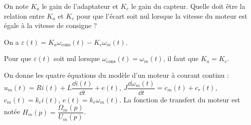 \begin{figure}[!h]
\begin{center}
\end{center}

\end{figure}
\normalsize
\fi

\begin{question}
On note $K_a$ le gain de l'adaptateur et $K_c$ le gain du capteur. Quelle doit être la relation entre 
$K_a$ et $K_c$ pour que l'écart soit nul lorsque la vitesse du moteur est égale à la vitesse de consigne ?
\end{question}
\ifprof
\begin{corrige}
On a $\varepsilon(t) = K_a \omega_{\text{cons}}(t) - K_c \omega_m(t)$. 

Pour que $\varepsilon(t)$ soit nul lorsque $\omega_{\text{cons}}(t) =  \omega_m(t)$, il faut que 
$K_a = K_c$.

\end{corrige}
\else
\fi

\ifprof
\else
On donne les quatre équations du modèle d’un moteur à courant continu :
$u_m(t) = Ri(t) + L \dfrac{\dd i(t)}{\dd t} + e(t)$, 
$J \dfrac{\dd \omega_m(t)}{\dd t} = c_m(t) + c_r(t)$, 
$c_m(t) = k_c i(t)$, $e(t) = k_e\omega_m(t)$.
La fonction de transfert du moteur est notée $H_m(p)=\dfrac{\Omega_m(p)}{U_m(p)}$.
\fi

